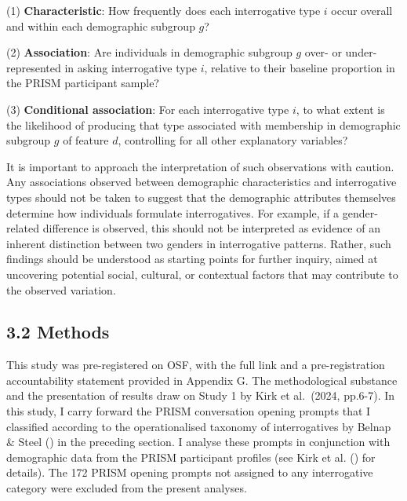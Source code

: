 \documentclass[
  12pt,
]{article}
\begin{document}
\begin{adjustwidth}{2em}{2em}
\setlength{\parindent}{0em}%
(1) \textbf{Characteristic}: How frequently does each interrogative type \(i\) occur overall and within each demographic subgroup \(g\)?  

(2) \textbf{Association}: Are individuals in demographic subgroup \(g\) over- or under-represented in asking interrogative type \(i\), relative to their baseline proportion in the PRISM participant sample?  

(3) \textbf{Conditional association}: For each interrogative type \(i\), to what extent is the likelihood of producing that type associated with membership in demographic subgroup \(g\) of feature \(d\), controlling for all other explanatory variables?
\end{adjustwidth}

It is important to approach the interpretation of such observations with caution. Any associations observed between demographic characteristics and interrogative types should not be taken to suggest that the demographic attributes themselves determine how individuals formulate interrogatives. For example, if a gender-related difference is observed, this should not be interpreted as evidence of an inherent distinction between two genders in interrogative patterns. Rather, such findings should be understood as starting points for further inquiry, aimed at uncovering potential social, cultural, or contextual factors that may contribute to the observed variation.

\subsection{3.2 Methods}\label{methods}

This study was pre-registered on OSF, with the full link and a pre-registration accountability statement provided in Appendix G. The methodological substance and the presentation of results draw on Study 1 by Kirk et al.~(2024, pp.6-7). In this study, I carry forward the PRISM conversation opening prompts that I classified according to the operationalised taxonomy of interrogatives by Belnap \& Steel () in the preceding section. I analyse these prompts in conjunction with demographic data from the PRISM participant profiles (see Kirk et al. () for details). The 172 PRISM opening prompts not assigned to any interrogative category were excluded from the present analyses.
\end{document}
